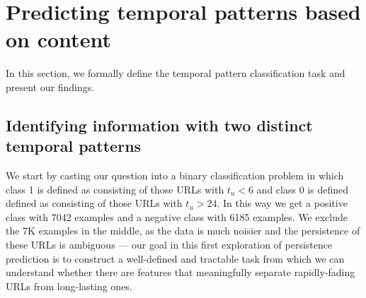 \documentclass[phd,tocprelim]{cornell}
\begin{document}
\section{Predicting temporal patterns based on content}
In this section, we formally define the temporal pattern classification task and present our findings.

\subsection{Identifying information with two distinct temporal patterns}
We start by casting our question into a binary classification problem
in which class 1 is defined as consisting of those
URLs with $t_u < 6$ and class 0 is defined
defined as consisting of those
URLs with $t_u > 24$. In this way we get a positive class
with 7042 examples and a negative class with 6185 examples. We exclude
the 7K examples in the middle, as the data is much noisier and the
persistence of these URLs is ambiguous --- our goal in this first
exploration of persistence prediction is to construct a 
well-defined and tractable task from which we can understand whether there
are features that meaningfully separate rapidly-fading URLs
from long-lasting ones.
 




\end{document}
